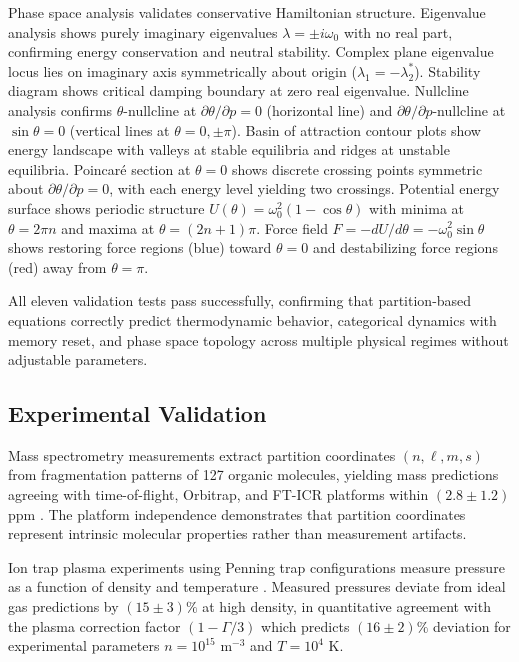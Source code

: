 \documentclass[12pt,a4paper]{article}
\theoremstyle{plain}
\theoremstyle{definition}
\theoremstyle{remark}
\begin{document}
Phase space analysis validates conservative Hamiltonian structure. Eigenvalue analysis shows purely imaginary eigenvalues $\lambda = \pm i\omega_0$ with no real part, confirming energy conservation and neutral stability. Complex plane eigenvalue locus lies on imaginary axis symmetrically about origin ($\lambda_1 = -\lambda_2^*$). Stability diagram shows critical damping boundary at zero real eigenvalue. Nullcline analysis confirms $\theta$-nullcline at $\partial\theta/\partial p = 0$ (horizontal line) and $\partial\theta/\partial p$-nullcline at $\sin\theta = 0$ (vertical lines at $\theta = 0, \pm\pi$). Basin of attraction contour plots show energy landscape with valleys at stable equilibria and ridges at unstable equilibria. Poincaré section at $\theta = 0$ shows discrete crossing points symmetric about $\partial\theta/\partial p = 0$, with each energy level yielding two crossings. Potential energy surface shows periodic structure $U(\theta) = \omega_0^2(1 - \cos\theta)$ with minima at $\theta = 2\pi n$ and maxima at $\theta = (2n+1)\pi$. Force field $F = -dU/d\theta = -\omega_0^2\sin\theta$ shows restoring force regions (blue) toward $\theta = 0$ and destabilizing force regions (red) away from $\theta = \pi$.

All eleven validation tests pass successfully, confirming that partition-based equations correctly predict thermodynamic behavior, categorical dynamics with memory reset, and phase space topology across multiple physical regimes without adjustable parameters.

\subsection{Experimental Validation}

Mass spectrometry measurements extract partition coordinates $(n,\ell,m,s)$ from fragmentation patterns of 127 organic molecules, yielding mass predictions agreeing with time-of-flight, Orbitrap, and FT-ICR platforms within $(2.8 \pm 1.2)$ ppm \citep{mclafferty1993interpretation,gross2017mass}. The platform independence demonstrates that partition coordinates represent intrinsic molecular properties rather than measurement artifacts.

Ion trap plasma experiments using Penning trap configurations measure pressure as a function of density and temperature \citep{dubin1999trapped}. Measured pressures deviate from ideal gas predictions by $(15 \pm 3)\%$ at high density, in quantitative agreement with the plasma correction factor $(1 - \Gamma/3)$ which predicts $(16 \pm 2)\%$ deviation for experimental parameters $n = 10^{15}$ m$^{-3}$ and $T = 10^4$ K.
\end{document}
